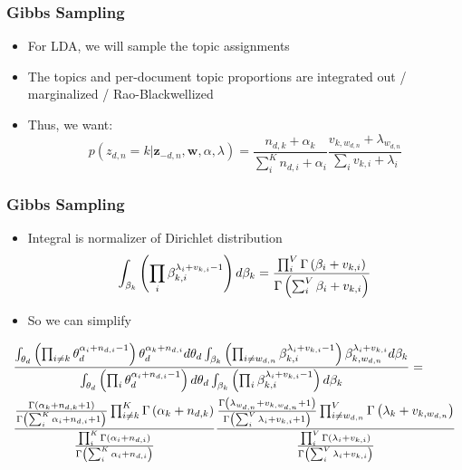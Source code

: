 \else

\begin{frame}
\frametitle{Gibbs Sampling}
\begin{itemize}
\item For LDA, we will sample the topic assignments
\item The topics and per-document topic proportions are integrated out / marginalized / Rao-Blackwellized
\item Thus, we want:
\begin{equation*}
p(z_{d,n} = k | {\bm z}_{-d,n}, {\bm w}, \alpha, \lambda) = \frac{n_{d, k} + \alpha_k}{ \sum_{i}^{K} { n_{d,i} + \alpha_i}} \frac{v_{k, w_{d,n}} + \lambda_{w_{d,n}}}{ \sum_{i} { v_{k,i} + \lambda_{i} }}
\end{equation*}
\end{itemize}
\end{frame}

\fi



\ifconjugacy

\begin{frame}
\frametitle{Gibbs Sampling}
\begin{itemize}
\item Integral is normalizer of Dirichlet distribution
\begin{equation*}
\int_{\beta_{k}}    \left( \prod_{i} \beta_{k,i} ^{ \lambda_i + v_{k,i} - 1} \right) d\beta_k = \dirfunc{i}{V}{\beta_i + v_{k,i}}
\end{equation*}
\pause
\item So we can simplify
\end{itemize}
\begin{footnotesize}
\begin{align*}
& \frac{ \int_{\theta_d} \left( \prod_{i \not = k} \theta_d^{\alpha_i + n_{d,i}
      - 1} \right)\theta_d^{\alpha_k + n_{d,i} } d\theta_d \int_{\beta_{k}}
  \left( \prod_{i \not = w_{d,n}} \beta_{k,i} ^{ \lambda_i + v_{k,i} - 1}
  \right) \beta_{k, w_{d,n}}^{\lambda_i + v_{k,i}} d\beta_k } { \int_{\theta_d}
  \left( \prod_{i} \theta_d^{\alpha_i + n_{d,i} - 1} \right) d\theta_d
  \int_{\beta_{k}}    \left( \prod_{i} \beta_{k,i} ^{ \lambda_i + v_{k,i} - 1}
  \right) d\beta_k } = \\
& \frac{
  \dirnum{i \not = k}{K}{\alpha_k + n_{d,k} + 1}{ \g{\sum_{i}^{K} \alpha_i +
      n_{d,i} + 1} } \g{\alpha_k + n_{d,k}}  }
{ \dirfunc{i}{K}{\alpha_i + n_{d,i}} }
\frac{
 \dirnum{i \not = w_{d,n}}{V}{\lambda_{w_{d,n}} + v_{k,w_{d,n}} + 1}{ \g{\sum_{i}^{V} \lambda_i + v_{k,i} + 1} } \g{\lambda_k + v_{k,w_{d,n}}}
}{ \dirfunc{i}{V}{\lambda_i + v_{k,i}} } \\
\end{align*}
\end{footnotesize}
\end{frame}


